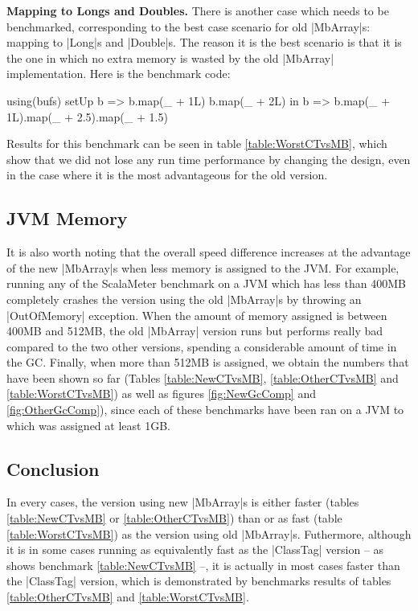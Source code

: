 \textbf{Mapping to Longs and Doubles.} There is another case which needs to be benchmarked, corresponding to the best case scenario for old |MbArray|s: mapping to |Long|s and |Double|s. The reason it is the best scenario is that it is the one in which no extra memory is wasted by the old |MbArray| implementation. Here is the benchmark code:

\begin{lstlisting-nobreak}
  using(bufs) setUp {
    b => 
      b.map(_ + 1L)
      b.map(_ + 2L)
  } in {
    b => b.map(_ + 1L).map(_ + 2.5).map(_ + 1.5)
  }
\end{lstlisting-nobreak}

Results for this benchmark can be seen in table \ref{table:WorstCTvsMB}, which show that we did not lose any run time performance by changing the design, even in the case where it is the most advantageous for the old version.

\subsection{JVM Memory}

It is also worth noting that the overall speed difference increases at the advantage of the new |MbArray|s when less memory is assigned to the JVM. For example, running any of the ScalaMeter benchmark on a JVM which has less than 400MB completely crashes the version using the old |MbArray|s by throwing an |OutOfMemory| exception. When the amount of memory assigned is between 400MB and 512MB, the old |MbArray| version runs but performs really bad compared to the two other versions, spending a considerable amount of time in the GC. Finally, when more than 512MB is assigned, we obtain the numbers that have been shown so far (Tables \ref{table:NewCTvsMB}, \ref{table:OtherCTvsMB} and \ref{table:WorstCTvsMB}) as well as figures \ref{fig:NewGcComp} and \ref{fig:OtherGcComp}), since each of these benchmarks have been ran on a JVM to which was assigned at least 1GB.

\subsection{Conclusion}

In every cases, the version using new |MbArray|s is either faster (tables \ref{table:NewCTvsMB} or \ref{table:OtherCTvsMB}) than or as fast (table \ref{table:WorstCTvsMB}) as the version using old |MbArray|s. Futhermore, although it is in some cases running as equivalently fast as the |ClassTag| version -- as shows benchmark \ref{table:NewCTvsMB} --, it is actually in most cases faster than the |ClassTag| version, which is demonstrated by benchmarks results of tables \ref{table:OtherCTvsMB} and \ref{table:WorstCTvsMB}. 



